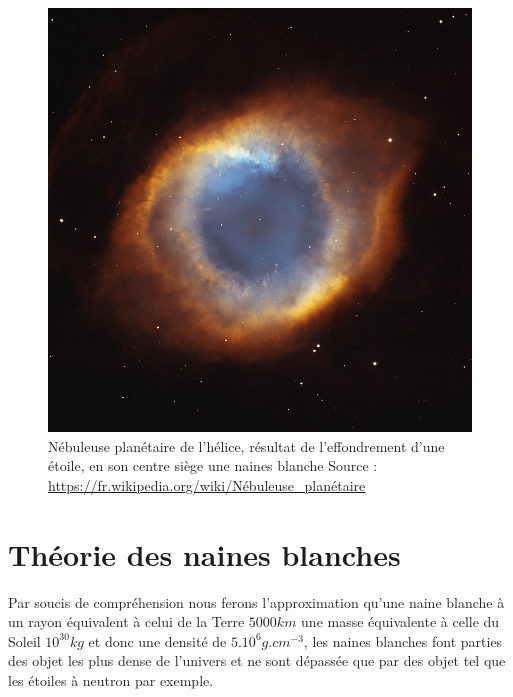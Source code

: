 \documentclass[a4paper]{rapport}
\begin{document}
\begin{figure}
    \center
    \includegraphics[scale=0.3]{nebuleuse}
    \caption{Nébuleuse planétaire de l’hélice, résultat de l'effondrement d'une étoile, en son centre siège une naines blanche  Source : \url{https://fr.wikipedia.org/wiki/Nébuleuse_planétaire}}
\end{figure}

\section{Théorie des naines blanches}
Par soucis de compréhension nous ferons l'approximation qu'une naine blanche à un rayon équivalent à celui de la Terre $5000 km$ une masse équivalente à celle du Soleil $10^{30}kg$ et donc une densité de $5.10^{6}g.cm^{-3}$, les naines blanches font parties des objet les plus dense de l'univers et ne sont dépassée que par des objet tel que les étoiles à neutron par exemple.
\end{document}
